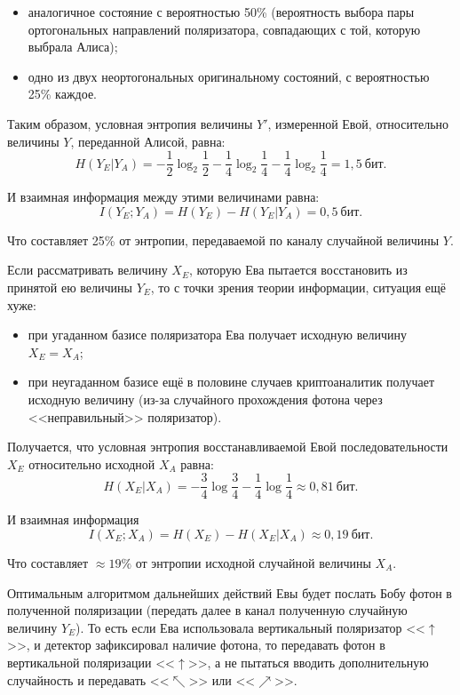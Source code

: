\begin{itemize}
	\item аналогичное состояние с вероятностью 50\% (вероятность выбора пары ортогональных направлений поляризатора, совпадающих с той, которую выбрала Алиса);
	\item одно из двух неортогональных оригинальному состояний, с вероятностью 25\% каждое.
\end{itemize}

Таким образом, условная энтропия величины $Y'$, измеренной Евой, относительно величины $Y$, переданной Алисой, равна:
\[ H \left( Y_E | Y_A \right) = - \frac{1}{2} \log_2 \frac{1}{2} - \frac{1}{4} \log_2 \frac{1}{4} - \frac{1}{4} \log_2 \frac{1}{4} = 1,5~\text{бит}. \]

И взаимная информация между этими величинами равна:
\[ I \left( Y_E ; Y_A \right) = H \left( Y_E \right) - H ( Y_E | Y_A ) = 0,5~\text{бит}.\]

Что составляет 25\% от энтропии, передаваемой по каналу случайной величины $Y$.

Если рассматривать величину $X_E$, которую Ева пытается восстановить из принятой ею величины $Y_E$, то с точки зрения теории информации, ситуация ещё хуже:

\begin{itemize}
	\item при угаданном базисе поляризатора Ева получает исходную величину $X_E = X_A$;
	\item при неугаданном базисе ещё в половине случаев криптоаналитик получает исходную величину (из-за случайного прохождения фотона через <<неправильный>> поляризатор).
\end{itemize}

Получается, что условная энтропия восстанавливаемой Евой последовательности $X_E$ относительно исходной $X_A$ равна:
\[ H \left( X_E | X_A \right) = - \frac{3}{4} \log \frac{3}{4} - \frac{1}{4} \log \frac{1}{4} \approx 0,81~\text{бит.}\]

И взаимная информация
\[ I \left( X_E; X_A \right) = H \left( X_E \right) - H \left( X_E | X_A \right) \approx 0,19~\text{бит}. \]

Что составляет $\approx 19\%$ от энтропии исходной случайной величины $X_A$.

Оптимальным алгоритмом дальнейших действий Евы будет послать Бобу фотон в полученной поляризации (передать далее в канал полученную случайную величину $Y_E$). То есть если Ева использовала вертикальный поляризатор <<$\uparrow$>>, и детектор зафиксировал наличие фотона, то передавать фотон в вертикальной поляризации <<$\uparrow$>>, а не пытаться вводить дополнительную случайность и передавать <<$\nwarrow$>> или <<$\nearrow$>>.

